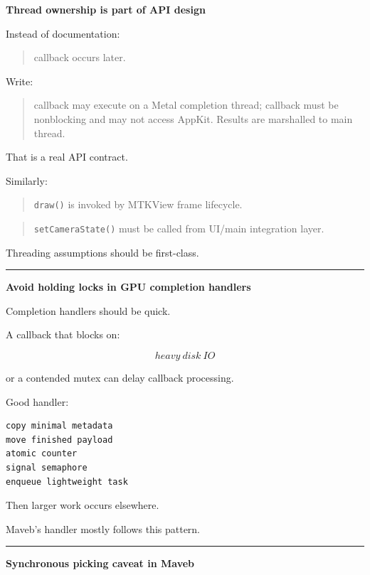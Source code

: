 \textbf{Thread ownership is part of API design}

Instead of documentation:

\begin{quote}
callback occurs later.
\end{quote}

Write:

\begin{quote}
callback may execute on a Metal completion thread; callback must be nonblocking and may not access AppKit. Results are marshalled to main thread.
\end{quote}

That is a real API contract.

Similarly:

\begin{quote}
\texttt{draw()} is invoked by MTKView frame lifecycle.
\end{quote}

\begin{quote}
\texttt{setCameraState()} must be called from UI/main integration layer.
\end{quote}

Threading assumptions should be first-class.

\begin{center}\rule{0.5\linewidth}{0.5pt}\end{center}

\textbf{Avoid holding locks in GPU completion handlers}

Completion handlers should be quick.

A callback that blocks on:

\[
heavy\ disk\ IO
\]

or a contended mutex can delay callback processing.

Good handler:

\begin{verbatim}
copy minimal metadata
move finished payload
atomic counter
signal semaphore
enqueue lightweight task
\end{verbatim}

Then larger work occurs elsewhere.

Maveb's handler mostly follows this pattern.

\begin{center}\rule{0.5\linewidth}{0.5pt}\end{center}

\textbf{Synchronous picking caveat in Maveb}

